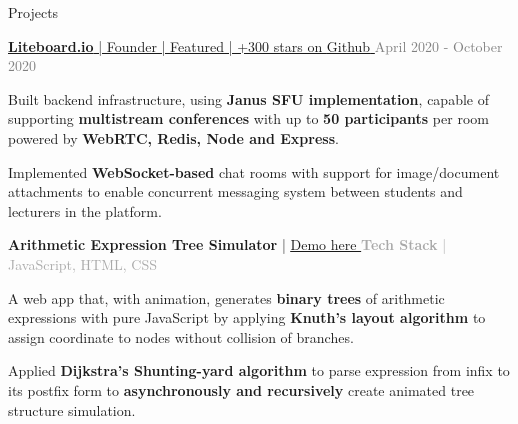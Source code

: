 \documentclass[hidelinks]{resume} %
\begin{document}
\begin{rSection}{Projects}

\begin{rSubsection}{\href{https://github.com/jeverd/lecture-experience}{\textbf{Liteboard.io}{ | Founder | \href{https://falauniversidades.com.br/projeto-gratuito-simplifica-o-acesso-as-aulas-on-line/}{\underline{Featured}} | +300 stars on \underline{Github} \faGithub}}}{\textcolor{gray}{April 2020 - October 2020}}{}
        \par
        \begin{bulletpoints}
            \vspace{-.10cm}
            \item Built backend infrastructure, using \textbf{Janus SFU implementation}, capable of supporting \textbf{multistream conferences} with up to \textbf{50 participants} per room powered by \textbf{WebRTC, Redis, Node and Express}.
             \vspace{-.13cm}
            \item Implemented \textbf{WebSocket-based} chat rooms with support for image/document attachments to enable concurrent messaging system between students and lecturers in the platform.
            \vspace{-.25cm}
        \end{bulletpoints}
\end{rSubsection}

\begin{rSubsection}{{\textbf{Arithmetic Expression Tree Simulator}} |
\href{https://lnogueir.github.io/expression-tree-gen/}{\underline{Demo here } \faGithub}}{\textcolor{darkgray}{\textbf{Tech Stack} | JavaScript, HTML, CSS}}{}
\par
    \begin{bulletpoints}
    \vspace{-.10cm}
        \item A web app that, with animation, generates \textbf{binary trees} of arithmetic expressions with pure JavaScript by applying \textbf{Knuth's layout algorithm} to assign coordinate to nodes without collision of branches.
        \vspace{-.13cm}
        \item Applied \textbf{Dijkstra's Shunting-yard algorithm} to parse expression from infix to its postfix form to \textbf{asynchronously and recursively} create animated tree structure simulation.
        \vspace{-.25cm}
    \end{bulletpoints}
\end{rSubsection}

\end{rSection}






\end{document}
